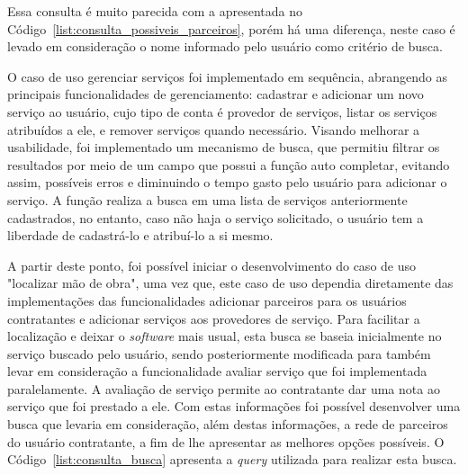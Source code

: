 \par Essa consulta é muito parecida com a apresentada no Código~\ref{list:consulta_possiveis_parceiros}, porém há uma diferença, neste caso é levado em consideração o nome informado pelo usuário como critério de busca.
 

\par O caso de uso gerenciar serviços foi implementado em sequência, abrangendo as principais funcionalidades de gerenciamento: cadastrar e adicionar um novo serviço ao usuário, cujo tipo de conta é provedor de serviços, listar os serviços atribuídos a ele, e remover serviços quando necessário. Visando melhorar a usabilidade, foi implementado um mecanismo de busca, que permitiu filtrar os resultados por meio de um campo que possui a função  auto completar, evitando assim, possíveis erros e diminuindo o tempo gasto pelo usuário para adicionar o serviço. A função realiza a busca em uma lista de serviços anteriormente cadastrados, no entanto, caso não haja o serviço solicitado, o usuário tem a liberdade de cadastrá-lo e atribuí-lo a si mesmo.


\par A partir deste ponto, foi possível iniciar o desenvolvimento do caso de uso "localizar mão de obra", uma vez que, este caso de uso dependia diretamente das implementações das funcionalidades adicionar parceiros para os usuários contratantes e adicionar serviços aos provedores de serviço. Para facilitar a localização e deixar o \textit{software} mais usual, esta busca se baseia inicialmente no serviço buscado pelo usuário, sendo posteriormente modificada para também levar em consideração a funcionalidade avaliar serviço que foi implementada paralelamente. A avaliação de serviço permite ao contratante dar uma nota ao serviço que foi prestado a ele. Com estas informações foi possível desenvolver uma busca que levaria em consideração, além destas informações, a rede de parceiros do usuário contratante, a fim de lhe apresentar as melhores opções possíveis. O Código~\ref{list:consulta_busca} apresenta a \textit{query} utilizada para realizar esta busca.


